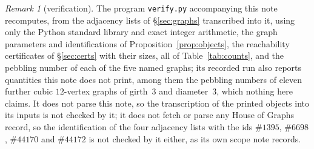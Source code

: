 \documentclass[11pt]{amsart}
\theoremstyle{remark}
\newtheorem*{remark}{Remark}
\newcommand{\HoG}[1]{\#\mathrm{#1}}
\begin{document}
\begin{remark}[verification]
The program \texttt{verify.py} accompanying this note recomputes, from the
adjacency lists of \S\ref{sec:graphs} transcribed into it, using only the Python
standard library and exact integer arithmetic, the graph parameters and
identifications of Proposition~\ref{prop:objects}, the reachability certificates
of \S\ref{sec:certs} with their sizes, all of Table~\ref{tab:counts}, and the
pebbling number of each of the five named graphs; its recorded run also reports
quantities this note does not print, among them the pebbling numbers of eleven
further cubic $12$-vertex graphs of girth~$3$ and diameter~$3$, which nothing here
claims. It does not parse this note, so the transcription of the printed objects
into its inputs is not checked by it; it does not fetch or parse any House of
Graphs record, so the identification of the four adjacency lists with the ids
$\HoG{1395}$, $\HoG{6698}$, $\HoG{44170}$ and $\HoG{44172}$ is not checked by it
either, as its own scope note records.
\end{remark}
\end{document}
